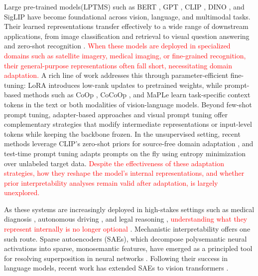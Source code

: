 Large pre-trained models(LPTMS) such as BERT \citep{devlin2019bert}, GPT \citep{brown2020language}, CLIP \citep{radford2021learning}, DINO \citep{caron2021emerging}, and SigLIP \citep{zhai2023sigmoid} have become foundational across vision, language, and multimodal tasks. Their learned representations transfer effectively to a wide range of downstream applications, from image classification and retrieval to visual question answering and zero-shot recognition \citep{bommasani2021opportunities}. \textcolor{red}{When these models are deployed in specialized domains such as satellite imagery, medical imaging, or fine-grained recognition, their general-purpose representations often fall short, necessitating domain adaptation.} A rich line of work addresses this through parameter-efficient fine-tuning: LoRA \citep{hu2022lora} introduces low-rank updates to pretrained weights, while prompt-based methods such as CoOp \citep{zhou2022learning}, CoCoOp \citep{zhou2022conditional}, and MaPLe \citep{khattak2023maple} learn task-specific context tokens in the text or both modalities of vision-language models. Beyond few-shot prompt tuning, adapter-based approaches \citep{gao2024clipadapter} and visual prompt tuning \citep{jia2022visual} offer complementary strategies that modify intermediate representations or input-level tokens while keeping the backbone frozen. In the unsupervised setting, recent methods leverage CLIP's zero-shot priors for source-free domain adaptation \citep{singha2023ad}, and test-time prompt tuning \citep{shu2022tpt} adapts prompts on the fly using entropy minimization over unlabeled target data. \textcolor{red}{Despite the effectiveness of these adaptation strategies, how they reshape the model's internal representations, and whether prior interpretability analyses remain valid after adaptation, is largely unexplored.}

As these systems are increasingly deployed in high-stakes settings such as medical diagnosis \citep{singhal2023large}, autonomous driving \citep{cui2024survey}, and legal reasoning \citep{guha2024legalbench}, \textcolor{red}{understanding what they represent internally is no longer optional} \citep{rauker2023transparent,kim2018interpretability}. Mechanistic interpretability offers one such route. Sparse autoencoders (SAEs), which decompose polysemantic neural activations into sparse, monosemantic features, have emerged as a principled tool for resolving superposition in neural networks \citep{cunningham2024sparse, rajamanoharan2024improving}. Following their success in language models, recent work has extended SAEs to vision transformers \citep{gandelsman2024interpreting, gao2025scaling}.

